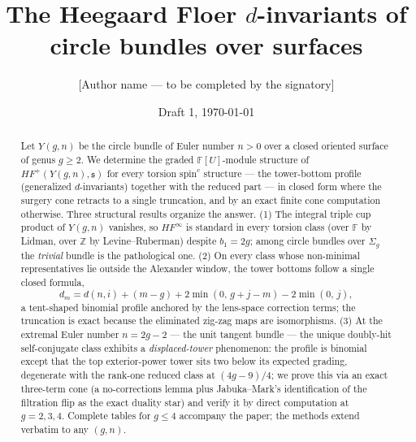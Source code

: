 \documentclass[11pt,reqno]{amsart}
\newcommand{\F}{\mathbb{F}}
\newcommand{\Z}{\mathbb{Z}}
\newcommand{\HFp}{\mathit{HF}^{+}}
\newcommand{\HFinf}{\mathit{HF}^{\infty}}
\newcommand{\Sig}{\Sigma}
\newcommand{\spinc}{\mathfrak{s}}
\newcommand{\Ymg}{Y(g,n)}
\theoremstyle{plain}
\begin{document}
\title[Heegaard Floer $d$-invariants of circle bundles]{The Heegaard Floer $d$-invariants of circle bundles over surfaces}

\author{[Author name --- to be completed by the signatory]}
\address{[Affiliation]}
\email{[email]}

\date{Draft 1, \today}


\begin{abstract}
Let $\Ymg$ be the circle bundle of Euler number $n>0$ over a closed oriented surface of genus $g\ge 2$. We determine the graded $\F[U]$-module structure of $\HFp(\Ymg,\spinc)$ for every torsion $\mathrm{spin}^c$ structure --- the tower-bottom profile (generalized $d$-invariants) together with the reduced part --- in closed form where the surgery cone retracts to a single truncation, and by an exact finite cone computation otherwise. Three structural results organize the answer.
(1) The integral triple cup product of $\Ymg$ vanishes, so $\HFinf$ is standard in every torsion class (over $\F$ by Lidman, over $\Z$ by Levine--Ruberman) despite $b_1=2g$; among circle bundles over $\Sig_g$ the \emph{trivial} bundle is the pathological one.
(2) On every class whose non-minimal representatives lie outside the Alexander window, the tower bottoms follow a single closed formula,
\[
 d_m = d(n,i) + (m-g) + 2\min(0,\,g+j-m) - 2\min(0,\,j),
\]
a tent-shaped binomial profile anchored by the lens-space correction terms; the truncation is exact because the eliminated zig-zag maps are isomorphisms.
(3) At the extremal Euler number $n=2g-2$ --- the unit tangent bundle --- the unique doubly-hit self-conjugate class exhibits a \emph{displaced-tower} phenomenon: the profile is binomial except that the top exterior-power tower sits two below its expected grading, degenerate with the rank-one reduced class at $(4g-9)/4$; we prove this via an exact three-term cone (a no-corrections lemma plus Jabuka--Mark's identification of the filtration flip as the exact duality star) and verify it by direct computation at $g=2,3,4$. Complete tables for $g\le 4$ accompany the paper; the methods extend verbatim to any $(g,n)$.
\end{abstract}

\maketitle
\end{document}

